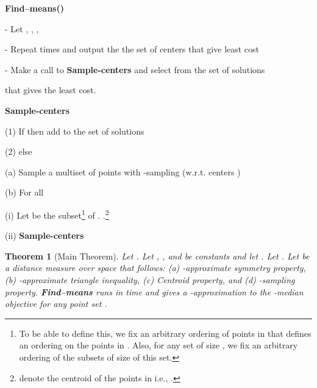 \documentclass[11pt]{article}
\newtheorem{theorem}{Theorem}
\begin{document}
\begin{center}
\begin{Algorithm}[h]
\begin{boxedminipage}{6.5in}
{\bf Find--means()}

\hspace{0.1in} - Let , , 
, 

\hspace{0.1in} - Repeat  times and output the the set of centers  that give least cost

\hspace{0.3in} - Make a call to {\bf Sample-centers} and select  from the set of solutions

\hspace{0.4in} that gives the least cost.

{\bf Sample-centers}

\hspace{0.1in} (1) If  then add  to the set of solutions

\hspace{0.1in} (2) else

\hspace{0.3in} (a) Sample a multiset  of  points with -sampling (w.r.t. centers )

\hspace{0.3in} (b) For all 

\hspace{0.5in} (i) Let  be the  subset\footnote{To be able to define this, we fix an arbitrary ordering of points in  that defines an ordering on the points in . 
Also, for any set of size , we fix an arbitrary ordering of the subsets of size  of this set. } of . 
.\footnote{ denote the centroid of the points in  i.e., .}

\hspace{0.5in} (ii) {\bf Sample-centers}
\end{boxedminipage}
\caption{{\bf Find--means()} gives -approximation for data sets , where the distance measure  over  that satisfies -approximate triangle inequality, -approximate symmetry, Centroid property, and -sampling property.}
\label{fig:k}
\end{Algorithm}
\end{center}

\begin{theorem}[Main Theorem]\label{thm:other}
Let . 
Let , , and  be constants and let . Let . Let  be a distance measure over space  that  follows:
(a) -approximate symmetry property,
(b) -approximate triangle inequality,
(c) Centroid property, and
(d) -sampling property.
{\bf Find--means} runs in time  and gives a -approximation to the -median objective for any point set .
\end{theorem}
\end{document}
